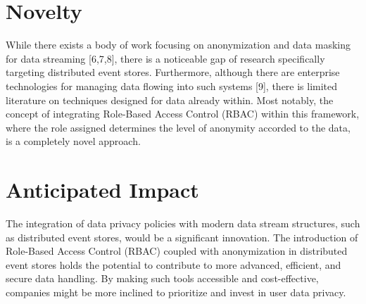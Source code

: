 \section{Novelty \label{sec:scope}}
While there exists a body of work focusing on anonymization and data masking for data streaming [6,7,8], there is a noticeable gap of research specifically targeting distributed event stores. Furthermore, although there are enterprise technologies for managing data flowing into such systems [9], there is limited literature on techniques designed for data already within. Most notably, the concept of integrating Role-Based Access Control (RBAC) within this framework, where the role assigned determines the level of anonymity accorded to the data, is a completely novel approach.

\section{Anticipated Impact \label{sec:outline}}


The integration of data privacy policies with modern data stream structures, such as distributed event stores, would be a significant innovation. The introduction of Role-Based Access Control (RBAC) coupled with anonymization in distributed event stores holds the potential to contribute to more advanced, efficient, and secure data handling. By making such tools accessible and cost-effective, companies might be more inclined to prioritize and invest in user data privacy.

